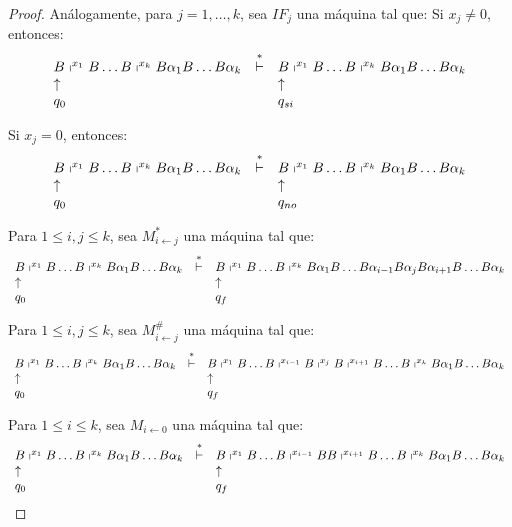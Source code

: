 \begin{proof}
    \PN Análogamente, para $j=1,\dotsc,k$, sea $IF_{j}$ una máquina tal que:
    \PN Si $x_{j} \neq 0$, entonces:
    \[
      \begin{array}{lcl}
        B \shortmid^{x_{1}} B \dotsc B \shortmid^{x_{k}} B \alpha_{1} B \dotsc B \alpha_{k} &\overset{\ast}{\vdash}& B
          \shortmid^{x_{1}} B \dotsc B \shortmid^{x_{k}} B \alpha_{1} B \dotsc B \alpha_{k} \\
        \uparrow && \uparrow \\
        q_{0} && q_{si}
      \end{array}
    \]

	  \PN Si $x_{j} = 0$, entonces:
    \[
      \begin{array}{lcl}
        B \shortmid^{x_{1}} B \dotsc B \shortmid^{x_{k}} B \alpha_{1} B \dotsc B \alpha_{k} &\overset{\ast}{\vdash}& B
          \shortmid^{x_{1}} B \dotsc B \shortmid^{x_{k}} B \alpha_{1} B \dotsc B \alpha_{k} \\
        \uparrow && \uparrow \\
        q_{0} && q_{no}
      \end{array}
    \]

	  \PN Para $1 \leq i,j \leq k$, sea $M_{i\leftarrow j}^{\ast}$ una máquina tal que:
    \[
      \begin{array}{lcl}
        B \shortmid^{x_{1}} B \dotsc B \shortmid^{x_{k}} B \alpha_{1} B \dotsc B \alpha_{k} &\overset{\ast}{\vdash}& B
          \shortmid^{x_{1}} B \dotsc B \shortmid^{x_{k}} B \alpha_{1} B \dotsc B \alpha_{i-1} B \alpha_{j} B
          \alpha_{i+1} B \dotsc B \alpha_{k} \\
        \uparrow && \uparrow \\
        q_{0} & & q_{f}
      \end{array}
    \]

    \PN Para $1 \leq i,j \leq k$, sea $M_{i\leftarrow j}^{\#}$ una máquina tal que:
		\[
      \begin{array}{lcl}
        B \shortmid^{x_{1}} B \dotsc B \shortmid^{x_{k}} B \alpha_{1} B \dotsc B \alpha_{k} &\overset{\ast}{\vdash}& B
          \shortmid^{x_{1}} B \dotsc B \shortmid^{x_{i-1}} B \shortmid^{x_{j}} B \shortmid^{x_{i+1}} B \dotsc B
          \shortmid^{x_{k}} B \alpha_{1} B \dotsc B \alpha_{k} \\
        \uparrow && \uparrow \\
        q_{0} & & q_{f}
      \end{array}
    \]

    \PN Para $1 \leq i \leq k$, sea $M_{i\leftarrow 0}$ una máquina tal que:
    \[
      \begin{array}{lcl}
        B \shortmid^{x_{1}} B \dotsc B \shortmid^{x_{k}} B \alpha_{1} B \dotsc B \alpha_{k} &\overset{\ast}{\vdash}& B
          \shortmid^{x_{1}} B \dotsc B \shortmid^{x_{i-1}} B B \shortmid^{x_{i+1}} B \dotsc B \shortmid^{x_{k}} B
          \alpha_{1} B \dotsc B \alpha_{k} \\
        \uparrow && \uparrow \\
        q_{0} & & q_{f}
      \end{array}
    \]


\end{proof}
